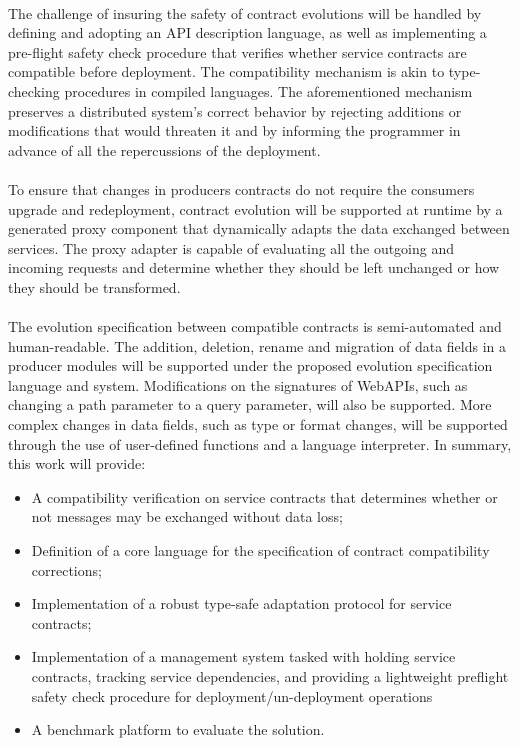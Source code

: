 \paragraph{}

The challenge of insuring the safety of contract evolutions will be handled by defining and adopting an API description language, as well as implementing
a pre-flight safety check procedure that verifies whether service contracts are compatible before deployment.
The compatibility mechanism is akin to type-checking procedures in compiled languages.
The aforementioned mechanism preserves a distributed system's correct behavior by rejecting additions or modifications that would threaten it and by informing the programmer in advance
of all the repercussions of the deployment.

\paragraph{}

To ensure that changes in producers contracts do not require the consumers upgrade and redeployment, contract evolution
will be supported at runtime by a generated proxy component that dynamically adapts the data exchanged between services.
The proxy adapter is capable of evaluating all the outgoing and incoming requests and determine whether
they should be left unchanged or how they should be transformed.

\paragraph{}

The evolution specification between compatible contracts is semi-automated and human-readable.
The addition, deletion, rename and migration of data fields in a producer modules will be supported under the proposed evolution specification language and system.
Modifications on the signatures of WebAPIs, such as changing a path parameter to a query parameter, will also be supported.
More complex changes in data fields, such as type or format changes,
will be supported through the use of user-defined functions and a language interpreter.
In summary, this work will provide:

\begin{itemize}
    \item A compatibility verification on service contracts that determines whether or not messages may be exchanged without data loss;
    \item Definition of a core language for the specification of contract compatibility corrections;
    \item Implementation of a robust type-safe adaptation protocol for service contracts;
    \item Implementation of a management system tasked with holding service contracts, tracking service dependencies,
    and providing a lightweight preflight safety check procedure for deployment/un-deployment operations
    \item A benchmark platform to evaluate the solution.
\end{itemize}

